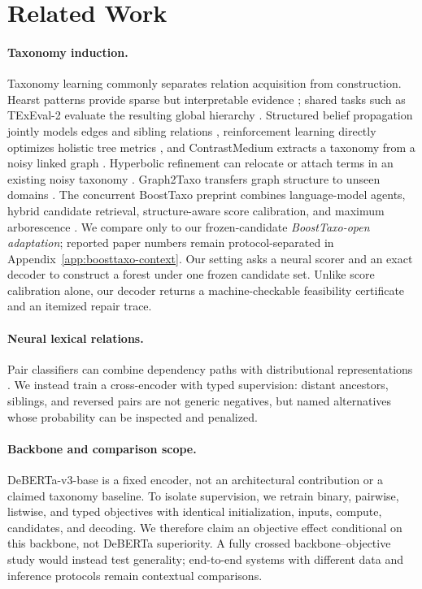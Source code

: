 \documentclass[11pt]{article}
\begin{document}
\section{Related Work}

\paragraph{Taxonomy induction.}
Taxonomy learning commonly separates relation acquisition from construction.
Hearst patterns provide sparse but interpretable evidence
\citep{hearst-1992-automatic}; shared tasks such as TExEval-2 evaluate the
resulting global hierarchy \citep{bordea-etal-2016-semeval}.  Structured belief
propagation jointly models edges and sibling relations
\citep{bansal-etal-2014-structured}, reinforcement learning directly
optimizes holistic tree metrics \citep{mao-etal-2018-end}, and
ContrastMedium extracts a taxonomy from a noisy linked graph
\citep{faralli-etal-2017-contrastmedium}.  Hyperbolic refinement can relocate
or attach terms in an existing noisy taxonomy \citep{aly-etal-2019-every}.
Graph2Taxo transfers graph structure to unseen domains
\citep{shang-etal-2020-taxonomy}.  The concurrent BoostTaxo preprint combines
language-model agents, hybrid candidate retrieval, structure-aware score
calibration, and maximum arborescence \citep{ling2026boosttaxo}.  We compare only to our frozen-candidate \emph{BoostTaxo-open adaptation};
reported paper numbers remain protocol-separated in
Appendix~\ref{app:boosttaxo-context}. Our setting asks a neural scorer and an exact decoder to
construct a forest under one frozen candidate set.  Unlike score calibration
alone, our decoder returns a machine-checkable feasibility certificate and an itemized
repair trace.

\paragraph{Neural lexical relations.}
Pair classifiers can combine dependency paths with distributional
representations \citep{shwartz-etal-2016-improving}.  We instead train a
cross-encoder with typed supervision: distant ancestors, siblings, and
reversed pairs are not generic negatives, but named alternatives whose
probability can be inspected and penalized.

\paragraph{Backbone and comparison scope.}
DeBERTa-v3-base \citep{he2021deberta} is a fixed encoder, not an architectural
contribution or a claimed taxonomy baseline. To isolate supervision, we retrain
binary, pairwise, listwise, and typed objectives with identical initialization,
inputs, compute, candidates, and decoding. We therefore claim an objective
effect conditional on this backbone, not DeBERTa superiority. A fully crossed
backbone--objective study would instead test generality; end-to-end systems
with different data and inference protocols remain contextual comparisons.
\end{document}
